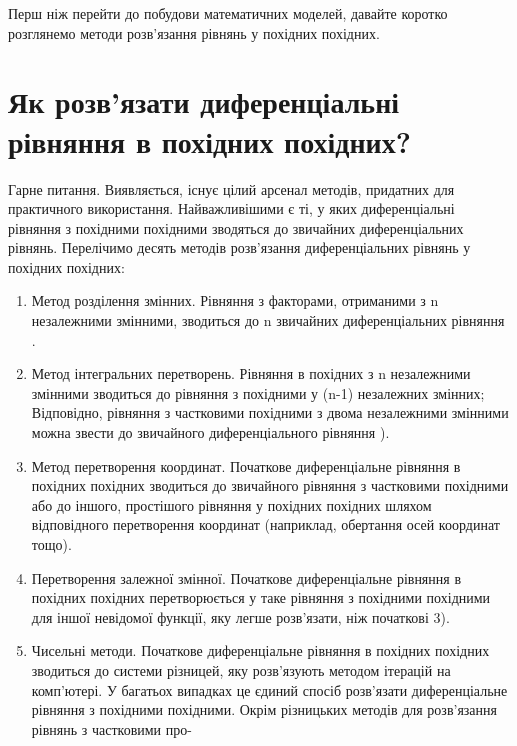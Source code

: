 \documentclass[
  ukrainian,
]{article}
\begin{document}
Перш ніж перейти до побудови математичних моделей, давайте коротко
розглянемо методи розв'язання рівнянь у похідних похідних.

\section{Як розв'язати диференціальні рівняння в похідних
похідних?}\label{ux44fux43a-ux440ux43eux437ux432ux44fux437ux430ux442ux438-ux434ux438ux444ux435ux440ux435ux43dux446ux456ux430ux43bux44cux43dux456-ux440ux456ux432ux43dux44fux43dux43dux44f-ux432-ux43fux43eux445ux456ux434ux43dux438ux445-ux43fux43eux445ux456ux434ux43dux438ux445}

Гарне питання. Виявляється, існує цілий арсенал методів, придатних для
практичного використання. Найважливішими є ті, у яких диференціальні
рівняння з похідними похідними зводяться до звичайних диференціальних
рівнянь. Перелічимо десять методів розв'язання диференціальних рівнянь у
похідних похідних:

\begin{enumerate}
\def\labelenumi{\arabic{enumi}.}
\item
  Метод розділення змінних. Рівняння з факторами, отриманими з n
  незалежними змінними, зводиться до n звичайних диференціальних
  рівняння .
\item
  Метод інтегральних перетворень. Рівняння в похідних з n незалежними
  змінними зводиться до рівняння з похідними у (n-1) незалежних змінних;
  Відповідно, рівняння з частковими похідними з двома незалежними
  змінними можна звести до звичайного диференціального рівняння ).
\item
  Метод перетворення координат. Початкове диференціальне рівняння в
  похідних похідних зводиться до звичайного рівняння з частковими
  похідними або до іншого, простішого рівняння у похідних похідних
  шляхом відповідного перетворення координат (наприклад, обертання осей
  координат тощо).
\item
  Перетворення залежної змінної. Початкове диференціальне рівняння в
  похідних похідних перетворюється у таке рівняння з похідними похідними
  для іншої невідомої функції, яку легше розв'язати, ніж початкові 3).
\item
  Чисельні методи. Початкове диференціальне рівняння в похідних похідних
  зводиться до системи різницей, яку розв'язують методом ітерацій на
  комп'ютері. У багатьох випадках це єдиний спосіб розв'язати
  диференціальне рівняння з похідними похідними. Окрім різницьких
  методів для розв'язання рівнянь з частковими про-
\end{enumerate}
\end{document}
